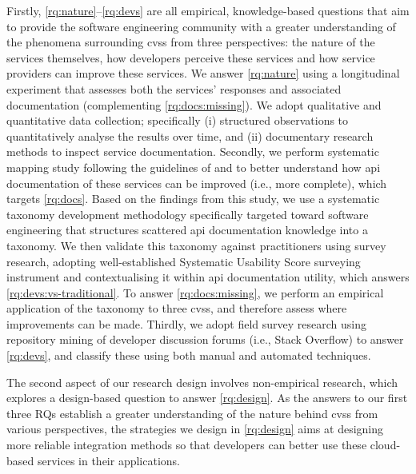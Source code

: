 Firstly, \ref{rq:nature}--\ref{rq:devs} are all empirical, knowledge-based questions \citep{Easterbrook:2007ws,Meltzoff:1998wg} that aim to provide the software engineering community with a greater understanding of the phenomena surrounding \glspl{cvs} from three perspectives: the nature of the services themselves, how developers perceive these services and how service providers can improve these services.  We answer \ref{rq:nature} using a longitudinal experiment that assesses both the services' responses and associated documentation (complementing \ref{rq:docs:missing}). We adopt qualitative and quantitative data collection; specifically (i) structured observations to quantitatively analyse the results over time, and (ii) documentary research methods to inspect service documentation.
Secondly, we perform systematic mapping study following the guidelines of \citet{Kitchenham:2007dd} and \citet{Petersen:2008td} to better understand how \gls{api} documentation of these services can be improved (i.e., more complete), which targets \cref{rq:docs}. Based on the findings from this study, we use a systematic taxonomy development methodology specifically targeted toward software engineering \citep{Usman:2017hn} that structures scattered \gls{api} documentation knowledge into a taxonomy. We then validate this taxonomy against practitioners using survey research, adopting \citeauthor{Brooke:1996ua} well-established Systematic Usability Score \citep{Brooke:1996ua} surveying instrument and contextualising it within \gls{api} documentation utility, which answers \ref{rq:devs:vs-traditional}. To answer \ref{rq:docs:missing}, we perform an empirical application of the taxonomy to three \glspl{cvs}, and therefore assess where improvements can be made.
Thirdly, we adopt field survey research using repository mining of developer discussion forums (i.e., Stack Overflow) to answer \ref{rq:devs}, and classify these using both manual and automated techniques.

The second aspect of our research design involves non-empirical research, which explores a design-based question \citep{Simon:1996uw} to answer \ref{rq:design}. As the answers to our first three RQs establish a greater understanding of the nature behind \glspl{cvs} from various perspectives, the strategies we design in \ref{rq:design} aims at designing more reliable integration methods so that developers can better use these cloud-based services in their applications.